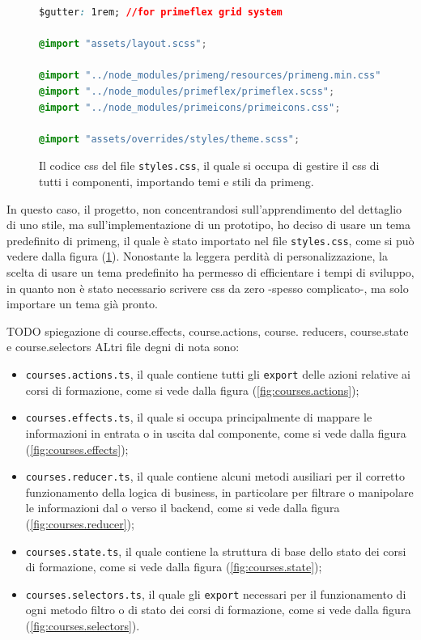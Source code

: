 \begin{figure}[H]
\centering
\begin{lstlisting}[language=CSS, linewidth=20cm, basicstyle=\tiny]
$gutter: 1rem; //for primeflex grid system

@import "assets/layout.scss";

@import "../node_modules/primeng/resources/primeng.min.css";
@import "../node_modules/primeflex/primeflex.scss";
@import "../node_modules/primeicons/primeicons.css";

@import "assets/overrides/styles/theme.scss";  
\end{lstlisting}
\caption{\label{fig:styles}Il codice \acrshort{css} del file \texttt{styles.css}, il quale si occupa di gestire il \acrshort{css} di tutti i componenti, importando temi e stili da \acrshort{primeng}.}
\end{figure}
In questo caso, il progetto, non concentrandosi sull'apprendimento del dettaglio di uno stile, ma sull'implementazione di un prototipo, ho deciso di usare un tema predefinito di \acrshort{primeng}, il quale è stato importato nel file \texttt{styles.css}, come si può vedere dalla figura (\ref{fig:styles}). Nonostante la leggera perdità di personalizzazione, la scelta di usare un tema predefinito ha permesso di efficientare i tempi di sviluppo, in quanto non è stato necessario scrivere \acrshort{css} da zero -spesso complicato-, ma solo importare un tema già pronto.\newline


TODO spiegazione di course.effects, course.actions, course.
reducers, course.state e course.selectors
ALtri file degni di nota sono:
\begin{itemize}
  \item \texttt{courses.actions.ts}, il quale contiene tutti gli \texttt{export} delle azioni relative ai corsi di formazione, come si vede dalla figura (\ref{fig:courses.actions});
  \item \texttt{courses.effects.ts}, il quale si occupa principalmente di mappare le informazioni in entrata o in uscita dal componente, come si vede dalla figura (\ref{fig:courses.effects});
  \item \texttt{courses.reducer.ts}, il quale contiene alcuni metodi ausiliari per il corretto funzionamento della logica di business, in particolare per filtrare o manipolare le informazioni dal o verso il backend, come si vede dalla figura (\ref{fig:courses.reducer});
  \item \texttt{courses.state.ts}, il quale contiene la struttura di base dello stato dei corsi di formazione, come si vede dalla figura (\ref{fig:courses.state});
  \item \texttt{courses.selectors.ts}, il quale gli \texttt{export} necessari per il funzionamento di ogni metodo filtro o di stato dei corsi di formazione, come si vede dalla figura (\ref{fig:courses.selectors}).
\end{itemize}

